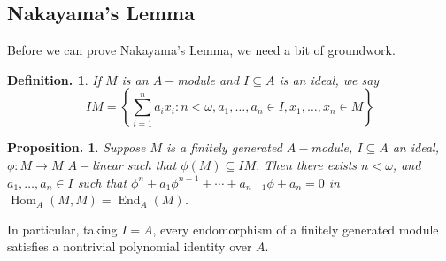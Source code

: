 \documentclass[11pt, a4paper]{memoir}
\theoremstyle{change}
\newtheorem{proposition}[theorem]{Proposition.}
\theoremstyle{plain}
\theoremstyle{nonumberplain}
\newtheorem{definition}{Definition.}
\DeclareMathOperator{\End}{End}
\DeclareMathOperator{\Hom}{Hom}
\numberwithin{equation}{section}
\begin{document}
\subsection{Nakayama's Lemma}
Before we can prove Nakayama's Lemma, we need a bit of groundwork.
\begin{definition}
    If $M$ is an $A-$module and $I\subseteq A$ is an ideal, we say
    \begin{equation*}
        IM=\left\{\sum\limits_{i=1}^n a_ix_i:n<\omega,a_1,\ldots,a_n\in I,x_1,\ldots,x_n\in M\right\}
    \end{equation*}
\end{definition}
\begin{proposition}\label{nk-prop}
    Suppose $M$ is a finitely generated $A-$module, $I\subseteq A$ an ideal, $\phi:M\to M$ $A-$linear such that $\phi(M)\subseteq IM$.
    Then there exists $n<\omega$, and $a_1,\ldots,a_n\in I$ such that $\phi^n+a_1\phi^{n-1}+\cdots+a_{n-1}\phi+a_n=0$ in $\Hom_A(M,M)=\End_A(M)$.
\end{proposition}
In particular, taking $I=A$, every endomorphism of a finitely generated module satisfies a nontrivial polynomial identity over $A$.
\end{document}
